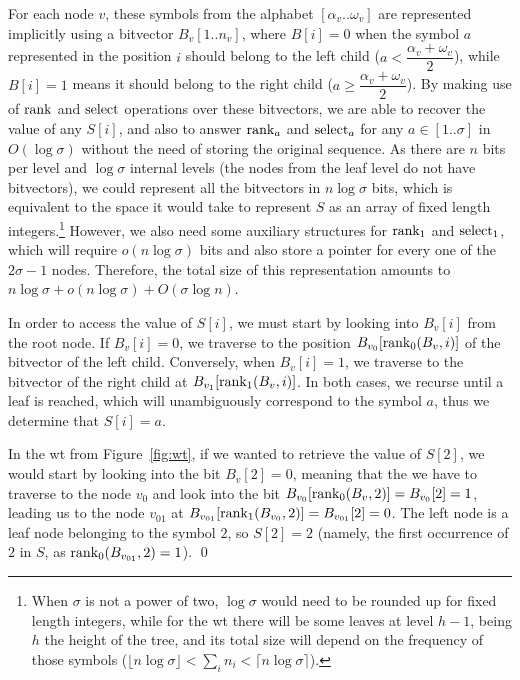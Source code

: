 \documentclass[a4paper,10pt,twoside]{book}
\begin{document}
    For each node $v$, these symbols from the alphabet $[\alpha_v..\omega_v]$ are represented implicitly using a bitvector $B_v[1..n_v]$, where $B[i] = 0$ when the symbol $a$ represented in the position $i$ should belong to the left child ($a < \dfrac{\alpha_v + \omega_v}{2}$), while $B[i] = 1$ means it should belong to the right child ($a \geq \dfrac{\alpha_v + \omega_v}{2}$). By making use of $\operatorname{rank}$ and $\operatorname{select}$ operations over these bitvectors, we are able to recover the value of any $S[i]$, and also to answer $\operatorname{rank}_a$ and $\operatorname{select}_a$ for any $a \in [1..\sigma]$ in $O(\log\sigma)$ without the need of storing the original sequence. As there are $n$ bits per level and $\log\sigma$ internal levels (the nodes from the leaf level do not have bitvectors), we could represent all the bitvectors in $n\log\sigma$ bits, which is equivalent to the space it would take to represent $S$ as an array of fixed length integers.\footnote{When $\sigma$ is not a power of two, $\log\sigma$ would need to be rounded up for fixed length integers, while for the \gls{wt} there will be some leaves at level $h-1$, being $h$ the height of the tree, and its total size will depend on the frequency of those symbols ($\lfloor n\log\sigma\rfloor < \sum_i n_i < \lceil n\log\sigma\rceil$).} However, we also need some auxiliary structures for $\operatorname{rank}_1$ and $\operatorname{select}_1$, which will require $o(n\log\sigma)$ bits and also store a pointer for every one of the $2\sigma-1$ nodes. Therefore, the total size of this representation amounts to $n\log\sigma + o(n\log\sigma) + O(\sigma\log n)$.
    
    In order to access the value of $S[i]$, we must start by looking into $B_v[i]$ from the root node. If $B_v[i]=0$, we traverse to the position $B_{v_0}[\operatorname{rank}_0(B_v,i)]$ of the bitvector of the left child. Conversely, when $B_v[i]=1$, we traverse to the bitvector of the right child at $B_{v_1}[\operatorname{rank}_1(B_v,i)]$. In both cases, we recurse until a leaf is reached, which will unambiguously correspond to the symbol $a$, thus we determine that $S[i]=a$.
    
    \medskip
    \begin{example} \label{exp:wtaccess}
    In the \gls{wt} from Figure~\ref{fig:wt}, if we wanted to retrieve the value of $S[2]$, we would start by looking into the bit $B_v[2]=0$, meaning that the we have to traverse to the node $v_0$ and look into the bit $B_{v_0}[\operatorname{rank}_0(B_v,2)] = B_{v_0}[2] = 1$, leading us to the node $v_{01}$ at $B_{v_{01}}[\operatorname{rank}_1(B_{v_0},2)] = B_{v_{01}}[2] = 0$. The left node is a leaf node belonging to the symbol $2$, so $S[2]=2$ (namely, the first occurrence of $2$ in $S$, as $\operatorname{rank}_0(B_{v_{01}}, 2) = 1$).
    \qed
    \end{example}
    
\end{document}
